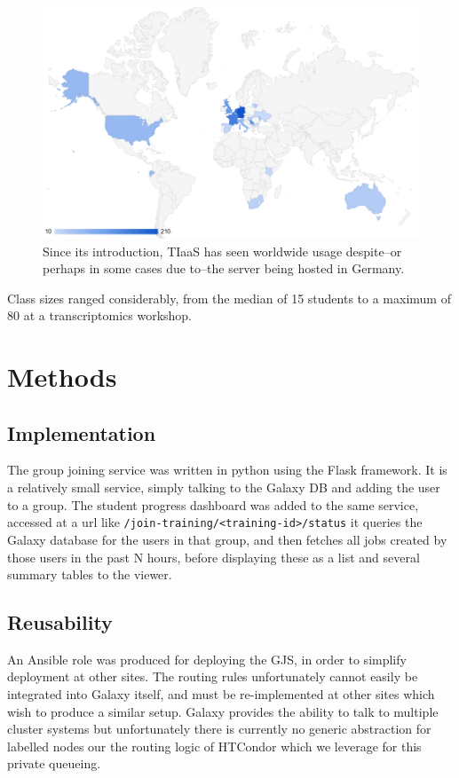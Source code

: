 \documentclass[a4paper,num-refs]{oup-contemporary}
\begin{document}
\begin{figure}[bt!]
\centering
\includegraphics[width=\linewidth]{images/map.png}
	\caption{Since its introduction, TIaaS has seen worldwide usage despite--or perhaps in some cases due to--the server being hosted in Germany.}\label{figure:map}
\end{figure}

Class sizes ranged considerably, from the median of 15 students to a maximum of 80 at a transcriptomics workshop.


\section{Methods}

\subsection{Implementation}
The group joining service was written in python using the Flask framework. It is a relatively small service, simply talking to the Galaxy DB and adding the user to a group.
The student progress dashboard was added to the same service, accessed at a url like \texttt{/join-training/<training-id>/status} it queries the Galaxy database for the users in that group, and then fetches all jobs created by those users in the past N hours, before displaying these as a list and several summary tables to the viewer.

\subsection{Reusability}
An Ansible role was produced for deploying the GJS, in order to simplify deployment at other sites. The routing rules unfortunately cannot easily be integrated into Galaxy itself, and must be re-implemented at other sites which wish to produce a similar setup. Galaxy provides the ability to talk to multiple cluster systems but unfortunately there is currently no generic abstraction for labelled nodes our the routing logic of HTCondor which we leverage for this private queueing.
\end{document}

